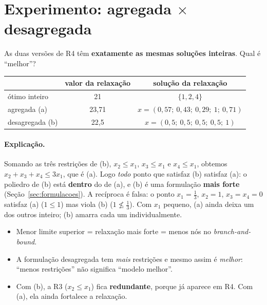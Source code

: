 \section{Experimento: agregada $\times$ desagregada}

As duas versões de R4 têm \textbf{exatamente as mesmas soluções inteiras}. Qual é ``melhor''?

\begin{center}
\begin{tabular}{lcc}
\toprule
& valor da relaxação & solução da relaxação\\
\midrule
ótimo inteiro & 21 & $\{1,2,4\}$\\
agregada (a) & 23,71 & $x=(0{,}57;\ 0{,}43;\ 0{,}29;\ 1;\ 0{,}71)$\\
desagregada (b) & 22,5 & $x=(0{,}5;\ 0{,}5;\ 0{,}5;\ 0{,}5;\ 1)$\\
\bottomrule
\end{tabular}
\end{center}

\paragraph{Explicação.} Somando as três restrições de (b), $x_2\le x_1$, $x_3\le x_1$ e $x_4\le x_1$, obtemos
$x_2+x_3+x_4\le3x_1$, que é (a). Logo \emph{todo} ponto que satisfaz (b) satisfaz (a): o poliedro de (b) está
\textbf{dentro} do de (a), e (b) é uma formulação \textbf{mais forte} (Seção~\ref{sec:formulacoes}). A recíproca é
falsa: o ponto $x_1=\tfrac13$, $x_2=1$, $x_3=x_4=0$ satisfaz (a) ($1\le1$) mas viola (b) ($1\not\le\tfrac13$).
Com $x_1$ pequeno, (a) ainda deixa um dos outros inteiro; (b) amarra cada um individualmente.

\begin{resumo}
\begin{itemize}
  \item Menor limite superior = relaxação mais forte = menos nós no \emph{branch-and-bound}.
  \item A formulação desagregada tem \emph{mais} restrições e mesmo assim é \emph{melhor}: ``menos restrições''
  não significa ``modelo melhor''.
  \item Com (b), a R3 ($x_2\le x_1$) fica \textbf{redundante}, porque já aparece em R4. Com (a), ela ainda fortalece a
  relaxação.
\end{itemize}
\end{resumo}
